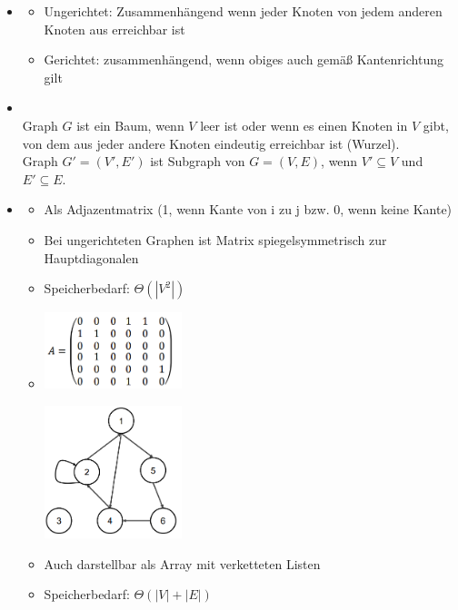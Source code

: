 \documentclass[
    12pt,
    a4paper,
    ngerman,
    color=3b,%
    marginpar=false,
    colorback=false,
    leqno,
]{tudaexercise}
\begin{document}
\begin{itemize}
        \item {}
            \begin{itemize}
                \item Ungerichtet: Zusammenhängend wenn jeder Knoten von jedem anderen Knoten aus erreichbar ist
                \item Gerichtet:  zusammenhängend, wenn obiges auch gemäß Kantenrichtung gilt
            \end{itemize}

        \item {} \\
            Graph $G$ ist ein Baum, wenn $V$ leer ist oder wenn es einen Knoten in $V$ gibt, \\
            von dem aus jeder andere Knoten eindeutig erreichbar ist (Wurzel). \\
            Graph $G'=(V',E')$ ist Subgraph von $G=(V,E)$, wenn $V'\subseteq V$ und $E' \subseteq E$.

        \item {}
            \begin{itemize}
                \item Als Adjazentmatrix (1, wenn Kante von i zu j bzw. 0, wenn keine Kante)
                \item Bei ungerichteten Graphen ist Matrix spiegelsymmetrisch zur Hauptdiagonalen
                \item Speicherbedarf: $\Theta(|V^2|)$
                \item[]
                    \begin{minipage}{0.45\textwidth}
                        \includegraphics[width=4cm]{pictures/graph1.PNG}
                    \end{minipage}
                    \begin{minipage}{0.45\textwidth}
                        \includegraphics[width=4cm]{pictures/graph2.PNG}
                    \end{minipage}
                \item Auch darstellbar als Array mit verketteten Listen
                \item Speicherbedarf: $\Theta(|V| + |E|)$
            \end{itemize}


\end{itemize}
\end{document}
